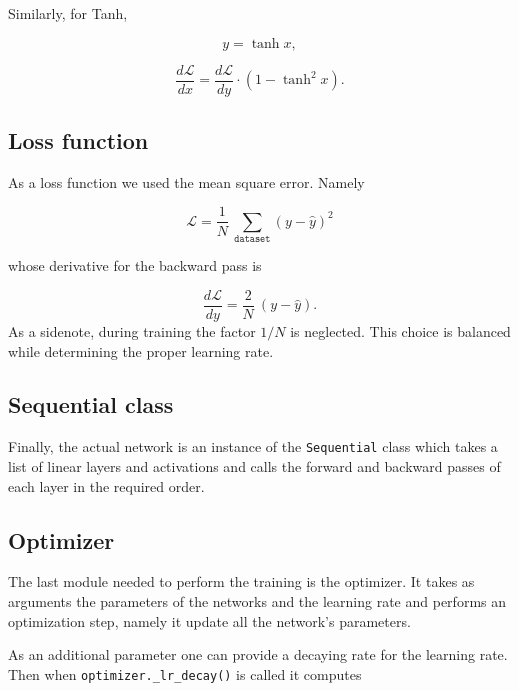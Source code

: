 \documentclass[11pt,conference,compsocconf]{IEEEtran}
\begin{document}
Similarly, for Tanh,

\begin{equation*}
    y = \tanh{x},
\end{equation*}

\begin{equation*}
    \frac{d\mathcal{L}}{dx} = \frac{d\mathcal{L}}{dy} \cdot (1 - \tanh^2{x}).
\end{equation*}

\subsection{Loss function}

As a loss function we used the mean square error. Namely

\begin{equation*}
    \mathcal{L} = \frac{1}{N} \: \sum_{\texttt{dataset}} (y - \hat{y})^2
\end{equation*}

whose derivative for the backward pass is  

\begin{equation*}
    \frac{d\mathcal{L}}{dy} = \frac{2}{N}\: (y - \hat{y}).
\end{equation*}
As a sidenote, during training the factor $1/N$ is neglected. This choice is balanced while determining the proper learning rate.

\subsection{Sequential class}

Finally, the actual network is an instance of the \texttt{Sequential} class which takes a list of linear layers and activations and calls the forward and backward passes of each layer in the required order.

\subsection{Optimizer}

The last module needed to perform the training is the optimizer. It takes as arguments the parameters of the networks and the learning rate and performs an optimization step, namely it update all the network's parameters.

As an additional parameter one can provide a decaying rate for the learning rate. Then when \texttt{optimizer.\_lr\_decay()} is called it computes
\end{document}
